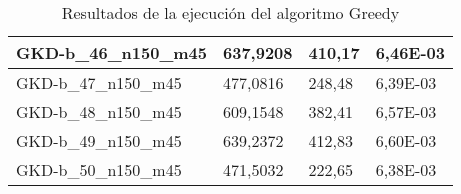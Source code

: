 \begin{table}[!ht]
\begin{adjustbox}{height=12cm}
\begin{tabular}{|l|l|l|l|}
        GKD-b\_46\_n150\_m45 & 637,9208 & 410,17 & 6,46E-03 \\ \hline
        GKD-b\_47\_n150\_m45 & 477,0816 & 248,48 & 6,39E-03 \\ \hline
        GKD-b\_48\_n150\_m45 & 609,1548 & 382,41 & 6,57E-03 \\ \hline
        GKD-b\_49\_n150\_m45 & 639,2372 & 412,83 & 6,60E-03 \\ \hline
        GKD-b\_50\_n150\_m45 & 471,5032 & 222,65 & 6,38E-03 \\ \hline
    \end{tabular}
    \end{adjustbox}
    \caption{Resultados de la ejecución del algoritmo Greedy}
\end{table}

\pagebreak